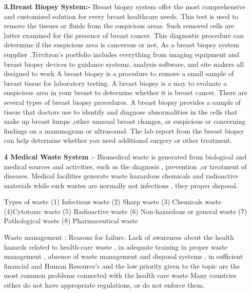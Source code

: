 \documentclass[
]{article}
\begin{document}
\textbf{3.Breast Biopsy System:-} Breast biopsy system offer the most
comprehensive and customized solution for every breast healthcare needs.
This test is used to remove the tissues or fluids from the suspicious
areas. Such removed cells are latter examined for the presence of breast
cancer. This diagnostic procedure can determine if the suspicious area
is cancerous or not, As a breast biopsy system supplier ,Trivitron's
portfolio includes everything from imaging equipment and breast biopsy
devices to guidance systems, analysis software, and site makers all
designed to work A breast biopsy is a procedure to remove a small sample
of breast tissue for laboratory testing. A breast biopsy is a may to
evaluate a suspicious area in your breast to determine whether it is
breast cancer. There are several types of breast biopsy procedures. A
breast biopsy provides a sample of tissue that doctors use to identify
and diagnose abnormalities in the cells that make up breast lumps ,other
unusual breast changes, or suspicious or concerning findings on a
mammogram or ultrasound. The lab report from the breast biopsy can help
determine whether you need additional surgery or other treatment.

\textbf{4 Medical Waste System} :- Biomedical waste is generated from
biological and medical sources and activities, such as the diagnosis ,
prevention ,or treatment of diseases. Medical facilities generate waste
hazardous chemicals and radioactive materials while such wastes are
normally not infections , they proper disposal.

Types of waste (1) Infectious waste (2) Sharp waste (3) Chemicals waste
(4)Cytotoxic waste (5) Radioactive waste (6) Non-hazardous or general
waste (7) Pathological waste (8) Pharmaceutical waste

Waste management : Reasons for failure. Lack of awareness about the
health hazards related to health-care waste , in adequate training in
proper waste management , absence of waste management and disposal
systems , in sufficient financial and Human Resource's and the low
priority given to the topic are the most common problems connected with
the health care waste Many countries either do not have appropriate
regulations, or do not enforce them.
\end{document}
